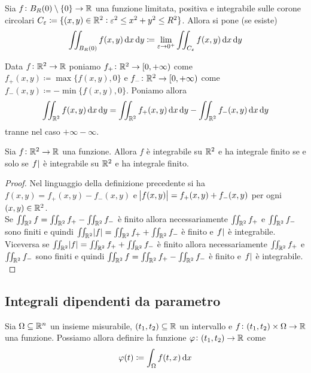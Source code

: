 \begin{definition}
	Sia $ f \colon B_R(0)\setminus\{0\} \to \mathbb{R} $ una funzione limitata, positiva e integrabile sulle corone circolari $ C_\varepsilon \coloneqq \{(x, y) \in \mathbb{R}^2 : \varepsilon^2 \leq x^2 + y^2 \leq R^2\} $. Allora si pone (se esiste)
	\begin{equation}
	\iint_{B_R(0)} f(x, y) \dif{x} \dif{y} \coloneqq \lim_{\epsilon \to 0^+} \iint_{C_\epsilon} f(x, y) \dif{x} \dif{y}
	\end{equation}
\end{definition}

\begin{definition} 
	Data $ f \colon \mathbb{R}^2 \to \mathbb{R} $ poniamo $ f_+ \colon \mathbb{R}^2 \to [0, +\infty) $ come $ f_+(x, y) \coloneqq \max{\{f(x, y), 0\}} $ e $ f_- \colon \mathbb{R}^2 \to [0, +\infty) $ come $ f_-(x, y) \coloneqq - \min{\{f(x, y), 0\}} $. Poniamo allora 
	\[
		\iint_{\R^2} f(x, y) \dif{x} \dif{y} = \iint_{\R^2} f_+(x, y) \dif{x} \dif{y} - \iint_{\R^2} f_-(x, y) \dif{x} \dif{y}
	\]
	tranne nel caso $ +\infty - \infty $. 
\end{definition}

\begin{thm}
	Sia $ f \colon \mathbb{R}^2 \to \mathbb{R} $ una funzione. Allora $ f $ è integrabile  su $ \mathbb{R}^2 $ e ha integrale finito se e solo se $ \abs{f} $ è integrabile su $ \mathbb{R}^2 $ e ha integrale finito. 
\end{thm}
%
\begin{proof}
	Nel linguaggio della definizione precedente si ha $ f(x, y) = f_+(x, y) - f_-(x, y) $ e $ \abs{f(x, y)} = f_+(x, y) + f_-(x, y) $ per ogni $ (x, y) \in \mathbb{R}^2 $. \\
	Se $ \iint_{\mathbb{R}^2} f = \iint_{\mathbb{R}^2} f_+ - \iint_{\mathbb{R}^2} f_- $ è finito allora necessariamente $ \iint_{\mathbb{R}^2} f_+ $ e $ \iint_{\mathbb{R}^2} f_- $ sono finiti e quindi $ \iint_{\mathbb{R}^2} \abs{f} = \iint_{\mathbb{R}^2} f_+ + \iint_{\mathbb{R}^2} f_- $ è finito e $ \abs{f} $ è integrabile. \\
	Viceversa se $ \iint_{\mathbb{R}^2} \abs{f} = \iint_{\mathbb{R}^2} f_+ + \iint_{\mathbb{R}^2} f_- $ è finito allora necessariamente $ \iint_{\mathbb{R}^2} f_+ $ e $ \iint_{\mathbb{R}^2} f_- $ sono finiti e quindi $ \iint_{\mathbb{R}^2} f = \iint_{\mathbb{R}^2} f_+ - \iint_{\mathbb{R}^2} f_- $ è finito e $ \abs{f} $ è integrabile. \\
\end{proof}


\subsection{Integrali dipendenti da parametro}
Sia $ \Omega \subseteq \mathbb{R}^n $ un insieme misurabile, $ (t_1, t_2) \subseteq \mathbb{R} $ un intervallo e $ f \colon (t_1, t_2) \times \Omega \to \mathbb{R} $ una funzione. Possiamo allora definire la funzione $ \varphi \colon (t_1, t_2) \to \mathbb{R} $ come 
\begin{equation}
	\varphi(t) \coloneqq \int_{\Omega} f(t, x) \dif{x}
\end{equation}

